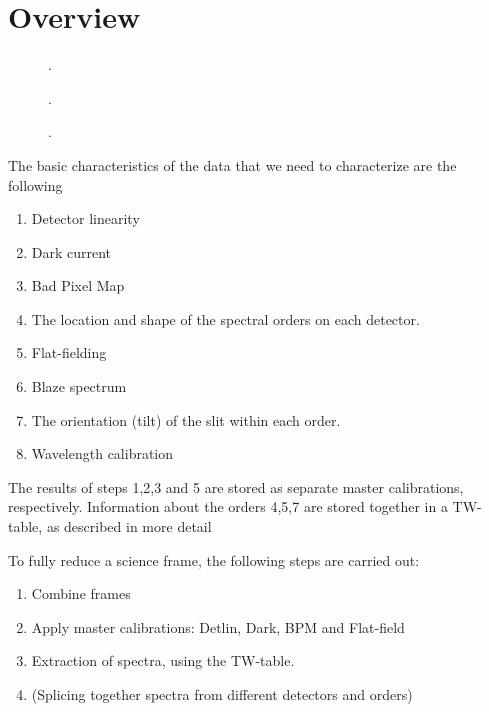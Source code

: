 \section{Overview}
\label{sec:overview}


\begin{figure}[!tb]
  \begin{center}
  \end{center}
  \caption{
    \label{fig:calibflow_detailed}
    .}
\end{figure}

\begin{figure}[!tb]
  \begin{center}
  \end{center}
  \caption{
    \label{fig:calibflow_simple}
    .}
\end{figure}

\begin{figure}[!tb]
  \begin{center}
  \end{center}
  \caption{
    \label{fig:fits_ext}
    .}
\end{figure}



The basic characteristics of the data that we need to characterize are the following
\begin{enumerate}
    \item Detector linearity
    \item Dark current
    \item Bad Pixel Map
    \item The location and shape of the spectral orders on each detector.
    \item Flat-fielding
    \item Blaze spectrum
    \item The orientation (tilt) of the slit within each order.
    \item Wavelength calibration
\end{enumerate} 

The results of steps 1,2,3 and 5 are stored as separate master calibrations, respectively. Information about the orders 4,5,7 are stored together in a TW-table, as described in more detail %

To fully reduce a science frame, the following steps are carried out:
\begin{enumerate}
    \item Combine frames
    \item Apply master calibrations: Detlin, Dark, BPM and Flat-field
    \item Extraction of spectra, using the TW-table.
    \item (Splicing together spectra from different detectors and orders)
\end{enumerate}

